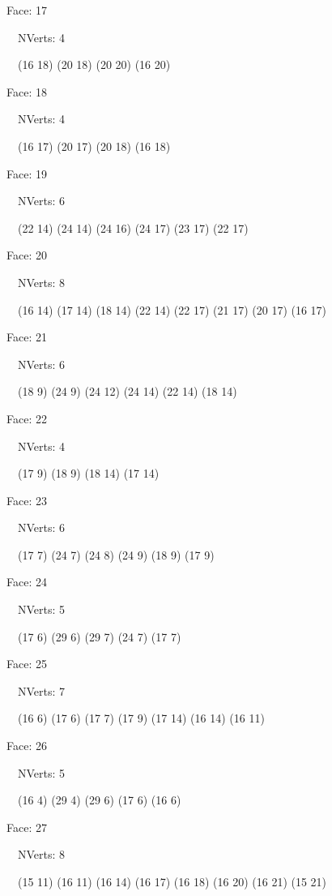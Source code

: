 \documentclass{article}
\begin{document}
{\footnotesize 

Face: 17

\   \    NVerts: 4

 \   \   (16 18) (20 18) (20 20) (16 20)}

{\footnotesize 

Face: 18

\   \    NVerts: 4

 \   \   (16 17) (20 17) (20 18) (16 18)}

{\footnotesize 

Face: 19

\   \    NVerts: 6

 \   \   (22 14) (24 14) (24 16) (24 17) (23 17) (22 17)}

{\footnotesize 

Face: 20

\   \    NVerts: 8

 \   \   (16 14) (17 14) (18 14) (22 14) (22 17) (21 17) (20 17) (16 17)}

{\footnotesize 

Face: 21

\   \    NVerts: 6

 \   \   (18 9) (24 9) (24 12) (24 14) (22 14) (18 14)}

{\footnotesize 

Face: 22

\   \    NVerts: 4

 \   \   (17 9) (18 9) (18 14) (17 14)}

{\footnotesize 

Face: 23

\   \    NVerts: 6

 \   \   (17 7) (24 7) (24 8) (24 9) (18 9) (17 9)}

{\footnotesize 

Face: 24

\   \    NVerts: 5

 \   \   (17 6) (29 6) (29 7) (24 7) (17 7)}

{\footnotesize 

Face: 25

\   \    NVerts: 7

 \   \   (16 6) (17 6) (17 7) (17 9) (17 14) (16 14) (16 11)}

{\footnotesize 

Face: 26

\   \    NVerts: 5

 \   \   (16 4) (29 4) (29 6) (17 6) (16 6)}

{\footnotesize 

Face: 27

\   \    NVerts: 8

 \   \   (15 11) (16 11) (16 14) (16 17) (16 18) (16 20) (16 21) (15 21)}
\end{document}
